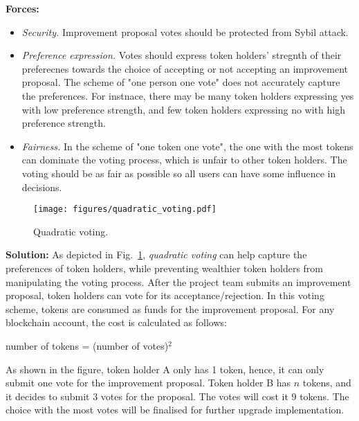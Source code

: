 \documentclass{article}
\begin{document}
\vspace{0.5em}\noindent \textbf{Forces:} 

\begin{itemize}
  \item \textit{Security.} Improvement proposal votes should be protected from Sybil attack.
  
  \item \textit{Preference expression.} Votes should express token holders' stregnth of their preferecnes towards the choice of accepting or not accepting an improvement proposal. The scheme of "one person one vote" does not accurately capture the preferences. For instnace, there may be many token holders expressing yes with low preference strength, and few token holders expressing no with high preference strength.
  

  \item \textit{Fairness.} In the scheme of "one token one vote", the one with the most tokens can dominate the voting process, which is unfair to other token holders. The voting should be as fair as possible so all users can have some influence in decisions.
  
  
\end{itemize}

\begin{figure}[!ht]
	\centering
	\texttt{[image: figures/quadratic\_voting.pdf]}
	\caption{Quadratic voting.}
	\label{pic:quadratic_voting}
\end{figure}

\vspace{0.5em}\noindent \textbf{Solution:} As depicted in Fig.~\ref{pic:quadratic_voting}, \textit{quadratic voting} can help capture the preferences of token holders, while preventing wealthier token holders from manipulating the voting process. After the project team submits an improvement proposal, token holders can vote for its acceptance/rejection. In this voting scheme, tokens are consumed as funds for the improvement proposal. For any blockchain account, the cost is calculated as follows:

\centerline{number of tokens = (number of votes)$^{2}$}

\noindent
As shown in the figure, token holder A only has 1 token, hence, it can only submit one vote for the improvement proposal. Token holder B has $n$ tokens, and it decides to submit 3 votes for the proposal. The votes will cost it 9 tokens. The choice with the most votes will be finalised for further upgrade implementation.
\end{document}

